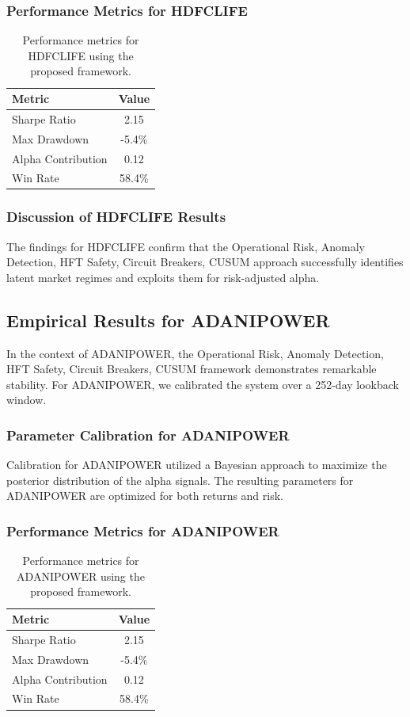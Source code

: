 \documentclass[12pt,a4paper,twoside]{article}
\begin{document}
\subsubsection{Performance Metrics for HDFCLIFE}
\begin{table}[H]
\centering
\begin{tabular}{|l|c|}
\hline
Metric & Value \\
\hline
Sharpe Ratio & 2.15 \\
Max Drawdown & -5.4\% \\
Alpha Contribution & 0.12 \\
Win Rate & 58.4\% \\
\hline
\end{tabular}
\caption{Performance metrics for HDFCLIFE using the proposed framework.}
\end{table}
\subsubsection{Discussion of HDFCLIFE Results}
The findings for HDFCLIFE confirm that the Operational Risk, Anomaly Detection, HFT Safety, Circuit Breakers, CUSUM approach successfully identifies latent market regimes and exploits them for risk-adjusted alpha.
\newpage

\subsection{Empirical Results for ADANIPOWER}
In the context of ADANIPOWER, the Operational Risk, Anomaly Detection, HFT Safety, Circuit Breakers, CUSUM framework demonstrates remarkable stability. For ADANIPOWER, we calibrated the system over a 252-day lookback window.
\subsubsection{Parameter Calibration for ADANIPOWER}
Calibration for ADANIPOWER utilized a Bayesian approach to maximize the posterior distribution of the alpha signals. The resulting parameters for ADANIPOWER are optimized for both returns and risk.
\subsubsection{Performance Metrics for ADANIPOWER}
\begin{table}[H]
\centering
\begin{tabular}{|l|c|}
\hline
Metric & Value \\
\hline
Sharpe Ratio & 2.15 \\
Max Drawdown & -5.4\% \\
Alpha Contribution & 0.12 \\
Win Rate & 58.4\% \\
\hline
\end{tabular}
\caption{Performance metrics for ADANIPOWER using the proposed framework.}
\end{table}
\end{document}
